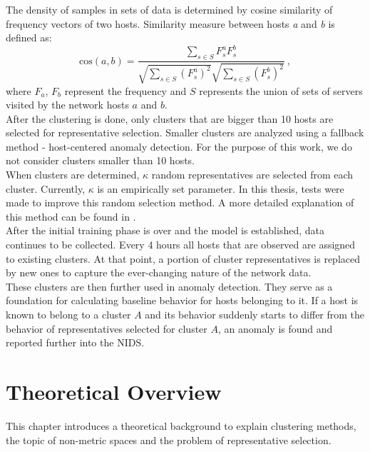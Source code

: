 \documentclass[thesis=B,english]{FITthesis}[2012/10/20]
\begin{document}
The density of samples in sets of data is determined by cosine similarity of frequency vectors of two hosts.
Similarity measure between hosts \textit{a} and \textit{b} is defined as:
$$\textrm{cos}(a, b) = \frac{\sum\limits_{s \in S} F_s^a F_s^b} {\sqrt{\sum\limits_{s \in S} (F_s^a)^2} \sqrt{\sum\limits_{s \in S} (F_s^b)^2}}\:,$$
where $F_a$, $F_b$ represent the frequency and $S$ represents the union of sets of servers visited by the network hosts $a$ and $b$. \\

After the clustering is done, only clusters that are bigger than 10 hosts are selected for representative selection.
Smaller clusters are analyzed using a fallback method - host-centered anomaly detection.
For the purpose of this work, we do not consider clusters smaller than 10 hosts. \\

When clusters are determined, $\kappa$ random representatives are selected from each cluster.
Currently, $\kappa$ is an empirically set parameter.
In this thesis, tests were made to improve this random selection method.
A more detailed explanation of this method can be found in \cite{kopp2018community}.\\

After the initial training phase is over and the model is established, data continues to be collected.
Every 4 hours all hosts that are observed are assigned to existing clusters.
At that point, a portion of cluster representatives is replaced by new ones to capture the ever-changing nature of the network data. \\

These clusters are then further used in anomaly detection.
They serve as a foundation for calculating baseline behavior for hosts belonging to it.
If a host is known to belong to a cluster $A$ and its behavior suddenly starts to differ from the behavior of representatives selected for cluster $A$, an anomaly is found and reported further into the NIDS.


\chapter{Theoretical Overview}

This chapter introduces a theoretical background to explain clustering methods, the topic of non-metric spaces and the problem of representative selection.
\end{document}
